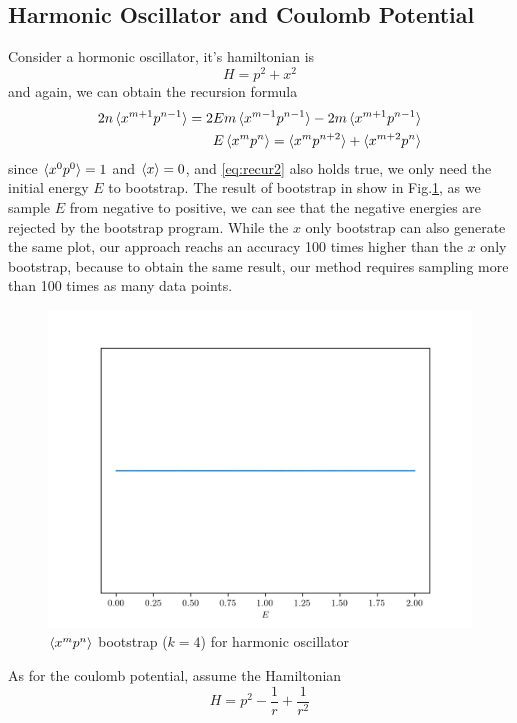 \documentclass[aps, preprint,amsmath, amssymb]{revtex4-2}
\begin{document}
\subsection{Harmonic Oscillator and Coulomb Potential}

Consider a hormonic oscillator, it's hamiltonian is
\begin{equation}
    H = p^2 + x^2
\end{equation}
and again, we can obtain the recursion formula
\begin{align}
    2n\braket{x^{m + 1} p^{n - 1}} = 2Em\braket{x^{m - 1} p^{n - 1}} - 2m\braket{x^{m + 1} p^{n - 1}}\notag \\ 
    E\braket{x^m p^n} = \braket{x^m p^{n + 2}} + \braket{x^{m + 2} p^n}
\end{align}
since $\braket{x^0 p^0} = 1$ and $\braket{x} = 0$, and \eqref{eq:recur2} also holds true, we only need the initial energy $E$ to bootstrap. The result of bootstrap in show in Fig.\ref{fig:harmonics}, as we sample $E$ from negative to positive, we can see that the negative energies are rejected by the bootstrap program. While the $x$ only bootstrap can also generate the same plot, our approach reachs an accuracy 100 times higher than the $x$ only bootstrap, because to obtain the same result, our method requires sampling more than 100 times as many data points.
\begin{figure}
    \includegraphics[width=0.8\linewidth]{harmonics.png}
    \caption{$\braket{x^m p^n}$ bootstrap ($k = 4$) for harmonic oscillator}
    \label{fig:harmonics}
\end{figure}
As for the coulomb potential, assume the Hamiltonian
\begin{equation}
    H = p^2 - \frac1r + \frac1{r^2}
\end{equation}
\end{document}
